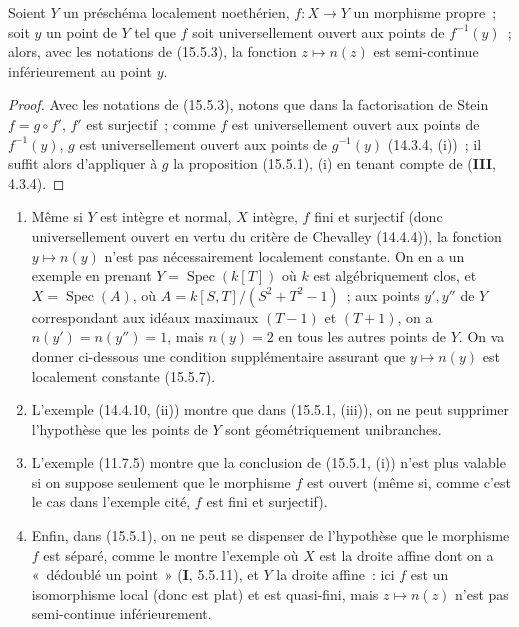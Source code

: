 \begin{corollary}[15.5.4]
\label{IV.15.5.4-fr}
Soient $Y$ un préschéma localement noethérien, $f:X\to Y$ un morphisme propre~; soit $y$ un point de $Y$ tel que $f$ soit universellement ouvert aux points de $f^{-1}(y)$~;
alors, avec les notations de (15.5.3), la fonction $z\mapsto n(z)$ est semi-continue inférieurement au point $y$.
\end{corollary}

\begin{proof}
Avec les notations de (15.5.3), notons que dans la factorisation de Stein $f=g\circ f'$, $f'$ est surjectif~; comme $f$ est universellement ouvert aux points de $f^{-1}(y)$, $g$ est universellement ouvert aux points de $g^{-1}(y)$ (14.3.4, (i))~; il suffit alors d'appliquer à $g$ la proposition (15.5.1), (i) en tenant compte de (\textbf{III}, 4.3.4).
\end{proof}

\begin{remarks}[15.5.5]
\label{IV.15.5.5-fr}
\begin{enumerate}[label=\emph{(\roman*)}]
  \item Même si $Y$ est intègre et normal, $X$ intègre, $f$ fini et surjectif (donc universellement ouvert en vertu du critère de Chevalley (14.4.4)), la fonction $y\mapsto n(y)$ n'est pas nécessairement localement constante. On en a un exemple en prenant $Y=\operatorname{Spec}(k[T])$ où $k$ est algébriquement clos, et $X=\operatorname{Spec}(A)$, où $A=k[S,T]/(S^2+T^2-1)$~; aux points $y',y''$ de $Y$ correspondant aux idéaux maximaux $(T-1)$ et $(T+1)$, on a $n(y')=n(y'')=1$, mais $n(y)=2$ en tous les autres points de $Y$. On va donner ci-dessous une condition supplémentaire assurant que $y\mapsto n(y)$ est localement constante (15.5.7).
  \item L'exemple (14.4.10, (ii)) montre que dans (15.5.1, (iii)), on ne peut supprimer l'hypothèse que les points de $Y$ sont géométriquement unibranches.
  \item L'exemple (11.7.5) montre que la conclusion de (15.5.1, (i)) n'est plus valable si on suppose seulement que le morphisme $f$ est ouvert (même si, comme c'est le cas dans l'exemple cité, $f$ est fini et surjectif).
  \item Enfin, dans (15.5.1), on ne peut se dispenser de l'hypothèse que le morphisme $f$ est séparé, comme le montre l'exemple où $X$ est la droite affine dont on a «~dédoublé un point~» (\textbf{I}, 5.5.11), et $Y$ la droite affine~: ici $f$ est un isomorphisme local (donc est plat) et est quasi-fini, mais $z\mapsto n(z)$ n'est pas semi-continue inférieurement.
\end{enumerate}
\end{remarks}

